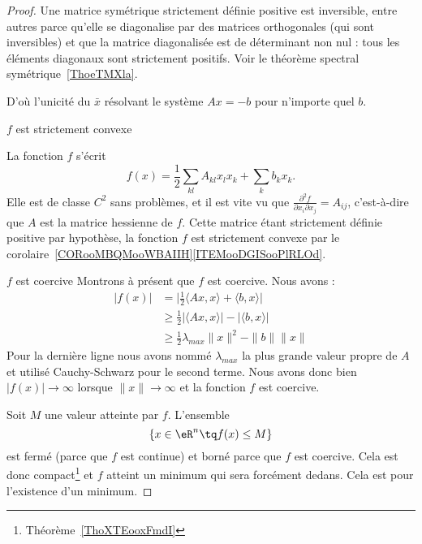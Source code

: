 \begin{proof}

    Une matrice symétrique strictement définie positive est inversible, entre autres parce qu'elle se diagonalise par des matrices orthogonales (qui sont inversibles) et que la matrice diagonalisée est de déterminant non nul : tous les éléments diagonaux sont strictement positifs. Voir le théorème spectral symétrique~\ref{ThoeTMXla}.

    D'où l'unicité du \( \bar x\) résolvant le système \( Ax=-b\) pour n'importe quel \( b\).

    \begin{subproof}
    \item[\( f\) est strictement convexe]

        La fonction \( f\) s'écrit
    \begin{equation}
        f(x)=\frac{ 1 }{2}\sum_{kl}A_{kl}x_lx_k+\sum_kb_kx_k.
    \end{equation}
    Elle est de classe \( C^2\) sans problèmes, et il est vite vu que \( \frac{ \partial^2f }{ \partial x_i\partial x_j }=A_{ij}\), c'est-à-dire que \( A\) est la matrice hessienne de \( f\). Cette matrice étant strictement définie positive par hypothèse, la fonction \( f\) est strictement convexe par le corolaire~\ref{CORooMBQMooWBAIIH}\ref{ITEMooDGISooPlRLOd}.

\item[\( f\) est coercive]
    Montrons à présent que \( f\) est coercive. Nous avons :
    \begin{subequations}
        \begin{align}
            | f(x) |&=\big| \frac{ 1 }{2}\langle Ax, x\rangle +\langle b, x\rangle  \big|\\
            &\geq\frac{ 1 }{2}| \langle Ax, x\rangle  |-| \langle b, x\rangle  |\\
            &\geq\frac{ 1 }{2}\lambda_{max}\| x \|^2-\| b \|\| x \|
        \end{align}
    \end{subequations}
    Pour la dernière ligne nous avons nommé \( \lambda_{max}\) la plus grande valeur propre de \( A\) et utilisé Cauchy-Schwarz pour le second terme. Nous avons donc bien \( | f(x) |\to \infty\) lorsque \( \| x \|\to\infty\) et la fonction \( f\) est coercive.
    \end{subproof}

    Soit \( M\) une valeur atteinte par \( f\). L'ensemble
    \begin{equation}
        \{ x\in \eR^n\tq f(x)\leq M \}
    \end{equation}
    est fermé (parce que \( f\) est continue) et borné parce que \( f\) est coercive. Cela est donc compact\footnote{Théorème~\ref{ThoXTEooxFmdI}} et \( f\) atteint un minimum qui sera forcément dedans. Cela est pour l'existence d'un minimum.


\end{proof}
